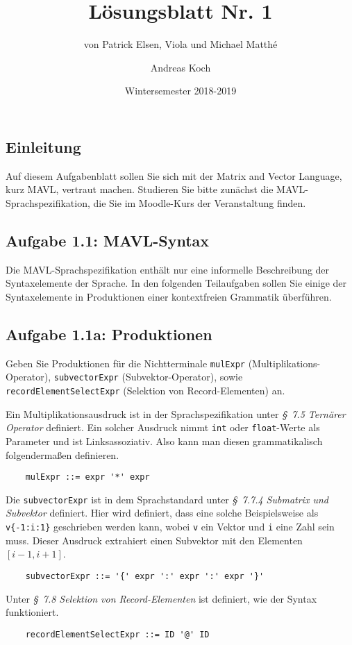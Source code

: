 \documentclass[
  ngerman,
  DIV=14
]{scrartcl}
\title{Lösungsblatt Nr. 1}
\date{Wintersemester 2018-2019}
\author{Andreas Koch}
\subtitle{von Patrick Elsen, Viola und Michael Matthé}
\begin{document}
\maketitle

\subsection*{Einleitung}

Auf diesem Aufgabenblatt sollen Sie sich mit der Matrix and Vector Language, kurz MAVL, vertraut machen. Studieren Sie bitte zunächst die MAVL-Sprachspezifikation, die Sie im Moodle-Kurs der Veranstaltung finden.

\subsection*{Aufgabe 1.1: MAVL-Syntax}

Die MAVL-Sprachspezifikation enthält nur eine informelle Beschreibung der Syntaxelemente der Sprache. In den folgenden Teilaufgaben sollen Sie einige der Syntaxelemente in Produktionen einer kontextfreien Grammatik überführen.

\subsection*{Aufgabe 1.1a: Produktionen}

Geben Sie Produktionen für die Nichtterminale \texttt{mulExpr} (Multiplikations-Operator), \texttt{subvectorExpr} (Subvektor-Operator), sowie \texttt{recordElementSelectExpr} (Selektion von Record-Elementen) an.

\bigskip\noindent
Ein Multiplikationsausdruck ist in der Sprachspezifikation unter \emph{§~7.5 Ternärer Operator} definiert. Ein solcher Ausdruck nimmt \verb|int| oder \verb|float|-Werte als Parameter und ist Linksassoziativ. Also kann man diesen grammatikalisch folgendermaßen definieren.
\begin{verbatim}
    mulExpr ::= expr '*' expr
\end{verbatim}
Die \verb|subvectorExpr| ist in dem Sprachstandard unter \emph{§~7.7.4 Submatrix und Subvektor} definiert. Hier wird definiert, dass eine solche Beispielsweise als \verb|v{-1:i:1}| geschrieben werden kann, wobei \verb|v| ein Vektor und \verb|i| eine Zahl sein muss. Dieser Ausdruck extrahiert einen Subvektor mit den Elementen $[i-1, i+1]$. 
\begin{verbatim}
    subvectorExpr ::= '{' expr ':' expr ':' expr '}'  
\end{verbatim}
Unter \emph{§~7.8 Selektion von Record-Elementen} ist definiert, wie der Syntax funktioniert.
\begin{verbatim}
    recordElementSelectExpr ::= ID '@' ID  
\end{verbatim}
\end{document}
